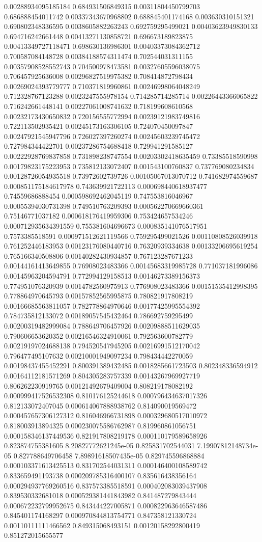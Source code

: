 \begin{table}
\begin{tabu}
\begin{sparkline}{10}
0.00288934095185184 0.684931506849315 0.00311804450799703 0.686888454011742 0.00337343670968802 0.688845401174168 0.003630310151321 0.690802348336595 0.0038605882263243 0.692759295499021 0.00403623949830133 0.694716242661448 0.00413271130858721 0.696673189823875 0.00413349727118471 0.698630136986301 0.00403373084362712 0.700587084148728 0.00384188574311474 0.702544031311155 0.00357908528552743 0.704500978473581 0.00327605596038075 0.706457925636008 0.00296827519975382 0.708414872798434 0.00269024393779777 0.710371819960861 0.00246998064048249 0.712328767123288 0.0023247555978154 0.714285714285714 0.00226443366065822 0.716242661448141 0.00227061008741632 0.718199608610568 0.00232173430650832 0.720156555772994 0.00239121983749816 0.722113502935421 0.00245173163306105 0.724070450097847 0.00247921545947796 0.726027397260274 0.00245603239745472 0.727984344422701 0.00237286754688418 0.729941291585127 0.00222928769837858 0.731898238747554 0.00203302418635459 0.73385518590998 0.00179823175223953 0.735812133072407 0.001543100760837 0.737769080234834 0.00128726054935518 0.73972602739726 0.00105067013070712 0.741682974559687 0.000851175184617978 0.743639921722113 0.000698440618937477 0.74559686888454 0.000598692462045119 0.747553816046967 0.00055394030731398 0.749510763209393 0.000562270669660361 0.75146771037182 0.000618176419959306 0.753424657534246 0.000712935634391559 0.755381604696673 0.000835141076517951 0.7573385518591 0.000971512621119566 0.759295499021526 0.00110808526039918 0.761252446183953 0.00123176080440716 0.76320939334638 0.00133206695619254 0.765166340508806 0.00140282430934857 0.767123287671233 0.00144161413649855 0.76908023483366 0.00145683319985728 0.771037181996086 0.00145963204594791 0.772994129158513 0.00146273389156373 0.774951076320939 0.0014782560975913 0.776908023483366 0.00151535412998395 0.778864970645793 0.00157852565995875 0.780821917808219 0.00166685563811057 0.782778864970646 0.00177425995554392 0.784735812133072 0.00189057545432464 0.786692759295499 0.00200319482999084 0.788649706457926 0.00209888511629035 0.790606653620352 0.00216546324910061 0.792563600782779 0.00219197024688138 0.794520547945205 0.00216991512170042 0.796477495107632 0.00210001949097234 0.798434442270059 0.00198437455452291 0.800391389432485 0.0018285661723503 0.802348336594912 0.00164112181571269 0.804305283757339 0.00143267969927719 0.806262230919765 0.00121492679409004 0.808219178082192 0.000999417526532308 0.810176125244618 0.000796434637017326 0.812133072407045 0.000614067888938762 0.814090019569472 0.000457657306127312 0.816046966731898 0.000329680517010972 0.818003913894325 0.000230075586762987 0.819960861056751 0.000158346137449536 0.821917808219178 0.000110179589658926 0.823874755381605 8.20827772621245e-05 0.825831702544031 7.19907812148734e-05 0.827788649706458 7.89891618507435e-05 0.829745596868884 0.000103371613425513 0.831702544031311 0.000146400108589742 0.833659491193738 0.000209785316400107 0.835616438356164 0.000294937769260516 0.837573385518591 0.000402083039437908 0.839530332681018 0.000529381441843982 0.841487279843444 0.000672232799952675 0.843444227005871 0.000822963646587486 0.845401174168297 0.000970844813754771 0.847358121330724 0.00110111111466562 0.849315068493151 0.00120158292800419 0.851272015655577 
\end{sparkline}
\end{tabu}
\end{table}
